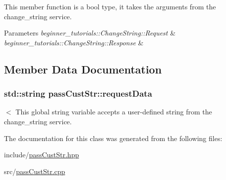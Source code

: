 This member function is a bool type, it takes the arguments from the change\+\_\+string service. 
\begin{DoxyParams}{Parameters}
{\em beginner\+\_\+tutorials\+::\+Change\+String\+::\+Request} & \\
\hline
{\em beginner\+\_\+tutorials\+::\+Change\+String\+::\+Response} & \\
\hline
\end{DoxyParams}


\subsection{Member Data Documentation}
\subsubsection[{\texorpdfstring{request\+Data}{requestData}}]{\setlength{\rightskip}{0pt plus 5cm}std\+::string pass\+Cust\+Str\+::request\+Data}\hypertarget{classpassCustStr_a3ce7263adc4bbc1d6b621c35a9da4f62}{}\label{classpassCustStr_a3ce7263adc4bbc1d6b621c35a9da4f62}
$<$ This global string variable accepts a user-\/defined string from the change\+\_\+string service. 

The documentation for this class was generated from the following files\+:\begin{DoxyCompactItemize}
\item 
include/\hyperlink{passCustStr_8hpp}{pass\+Cust\+Str.\+hpp}\item 
src/\hyperlink{passCustStr_8cpp}{pass\+Cust\+Str.\+cpp}\end{DoxyCompactItemize}
